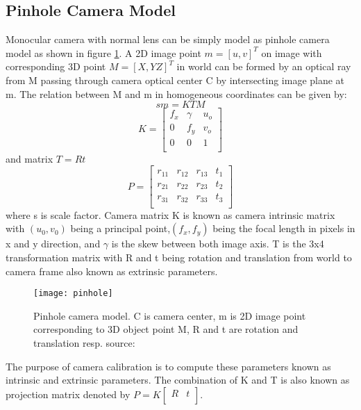 \subsection{Pinhole Camera Model}
Monocular camera with normal lens can be simply model as pinhole camera model as shown in figure \ref{fig:pinhole}. A 2D image point  $ m = [u,v]^{T} $ on image with corresponding 3D point $ M = [ X,Y Z]^{T} $ in world can be formed by an optical ray from M passing through camera optical center C by intersecting image plane at m. The relation between M and m in homogeneous coordinates can be given by: 
\begin{equation*}
sm= KTM 
\end{equation*} 
\begin{equation*}
K = \begin{bmatrix}
f_{x} & \gamma & u_{o} \\
0    &  f_{y} & v_{o} \\
0    &   0    & 1 \\
\end{bmatrix}
\end{equation*} 
and matrix $ T = R t $
\begin{equation*}
P = \begin{bmatrix}
r_{11} & r_{12} & r_{13} & t_{1} \\
r_{21} & r_{22} & r_{23} & t_{2} \\
r_{31} & r_{32} & r_{33} & t_{3} \\
\end{bmatrix}
\end{equation*} 
where s is scale factor. Camera matrix K is known as camera intrinsic matrix with $ (u_{0},v_{0}) $ being a principal point,$ (f_{x},f_{y}) $ being the focal length in pixels in x and y direction, and $ \gamma $ is the skew between both image axis. T is the 3x4 transformation matrix with R and t being rotation and translation from world to camera frame also known as extrinsic parameters.\\
\begin{figure}[h!]
	\centering
	\texttt{[image: pinhole]}
	\caption{Pinhole camera model. C is camera center, m is 2D image point corresponding to 3D object point M, R and t are rotation and translation resp. source:\cite{cameracalib}}
	\label{fig:pinhole}
\end{figure}
\newline
The purpose of camera calibration is to compute these parameters known as intrinsic and extrinsic parameters. The combination of K and T is also known as projection matrix denoted by $ P = K \begin{bmatrix} 
            R & t \\
            \end{bmatrix} $.
